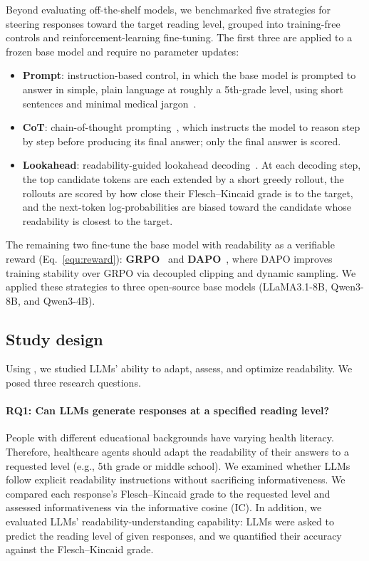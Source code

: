 Beyond evaluating off-the-shelf models, we benchmarked five strategies for steering responses toward the target reading level, grouped into training-free controls and reinforcement-learning fine-tuning. The first three are applied to a frozen base model and require no parameter updates:
\begin{itemize}[leftmargin=*]
\item \textbf{Prompt}: instruction-based control, in which the base model is prompted to answer in simple, plain language at roughly a 5th-grade level, using short sentences and minimal medical jargon~\citep{ribeiro-etal-2023-generating,malik2024tarzan}.
\item \textbf{CoT}: chain-of-thought prompting~\citep{wei2022chain}, which instructs the model to reason step by step before producing its final answer; only the final answer is scored.
\item \textbf{Lookahead}: readability-guided lookahead decoding~\citep{ribeiro-etal-2023-generating}. At each decoding step, the top candidate tokens are each extended by a short greedy rollout, the rollouts are scored by how close their Flesch--Kincaid grade is to the target, and the next-token log-probabilities are biased toward the candidate whose readability is closest to the target.
\end{itemize}
The remaining two fine-tune the base model with readability as a verifiable reward (Eq.~\ref{equ:reward}): \textbf{GRPO}~\citep{shao2024deepseekmath} and \textbf{DAPO}~\citep{yu2025dapo}, where DAPO improves training stability over GRPO via decoupled clipping and dynamic sampling. We applied these strategies to three open-source base models (LLaMA3.1-8B, Qwen3-8B, and Qwen3-4B).

\subsection{Study design}\label{sec:questions}

Using \repqa, we studied LLMs' ability to adapt, assess, and optimize readability. We posed three research questions.

\paragraph{RQ1: Can LLMs generate responses at a specified reading level?}
People with different educational backgrounds have varying health literacy.
Therefore, healthcare agents should adapt the readability of their answers to a requested level (e.g., 5th grade or middle school).
We examined whether LLMs follow explicit readability instructions without sacrificing informativeness.
We compared each response's Flesch–Kincaid grade to the requested level and assessed informativeness via the informative cosine (IC).
In addition, we evaluated LLMs' readability-understanding capability: LLMs were asked to predict the reading level of given responses, and we quantified their accuracy against the Flesch–Kincaid grade.


